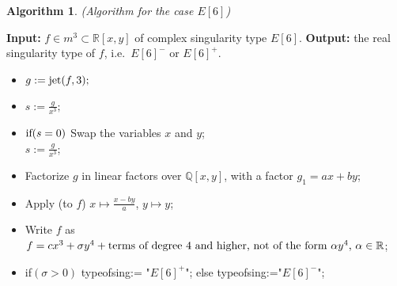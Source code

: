 \documentclass{amsproc}
\begin{document}
\newtheorem{E[6]}[kjet]{Algorithm}
\begin{E[6]}(Algorithm for the case $E[6]$)
\end{E[6]}
\noindent\textnormal{\bf Input:} $f\in m^3\subset\mathbb R[x,y]$ of complex singularity type $E[6]$.\newline
\textnormal{\bf Output:} the real singularity type of $f$, i.e.~$E[6]^-$ or $E[6]^+$.
\begin{itemize}
\item $g:= \textnormal{jet}(f,3);$
\item $s:= \frac{g}{x^3};$
\item $\textnormal{if}(s=0)$\newline
\phantom{}\quad Swap the variables $x$ and $y$;\\
\phantom{}\quad $s:=\frac{g}{x^3}$;
\item Factorize $g$ in linear factors over $\mathbb Q[x,y]$, with a factor $g_1=ax+by$;
\item Apply (to $f$) $x\mapsto \frac{x-by}{a}$, $y\mapsto y$;
\item Write $f$ as $f=cx^3+\sigma y^4+\textnormal{terms of degree $4$ and higher, not of the form $\alpha y^4$, $\alpha\in\mathbb R$}$;
\item \textnormal{if}$(\sigma>0)$\newline
\phantom{}\quad typeofsing:= "$E[6]^+$";\newline
\phantom{} else\newline
\phantom{}\quad typeofsing:="$E[6]^-$";
\end{itemize}
\end{document}
